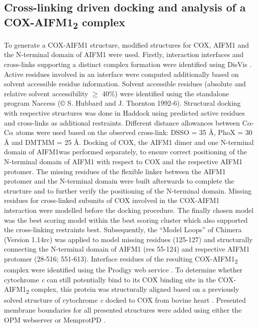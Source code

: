 \subsection*{Cross-linking driven docking and analysis of a COX-AIFM1\textsubscript{2} complex}
To generate a COX-AIFM1 structure, modified structures for COX, AIFM1 and the N-terminal domain of AIFM1 were used. Firstly, interaction interfaces and cross-links supporting a distinct complex formation were identified using DisVis \cite{RN44}. Active residues involved in an interface were computed additionally based on solvent accessible residue information. Solvent accessible residues (absolute and relative solvent accessibility $\geq$ 40\%) were identified using the standalone program Naccess (© S. Hubbard and J. Thornton 1992-6). Structural docking with respective structures was done in Haddock \cite{RN68, RN45} using predicted active residues and cross-links as additional restraints. Different distance allowances between C$\alpha$-C$\alpha$ atoms were used based on the observed cross-link: DSSO = 35 Å, PhoX = 30 Å and DMTMM = 25 Å. Docking of COX, the AIFM1 dimer and one N-terminal domain of AIFM1was performed separately, to ensure correct positioning of the N-terminal domain of AIFM1 with respect to COX and the respective AIFM1 protomer. The missing residues of the flexible linker between the AIFM1 protomer and the N-terminal domain were built afterwards to complete the structure and to further verify the positioning of the N-terminal domain. Missing residues for cross-linked subunits of COX involved in the COX-AIFM1 interaction were modelled before the docking procedure. The finally chosen model was the best scoring model within the best scoring cluster which also supported the cross-linking restraints best. Subsequently, the “Model Loops” of Chimera (Version 1.14rc) \cite{RN47, RN46} was applied to model missing residues (125-127) and structurally connecting the N-terminal domain of AIFM1 (res 55-124) and respective AIFM1 protomer (28-516; 551-613). Interface residues of the resulting COX-AIFM1\textsubscript{2}  complex were identified using the Prodigy web service \cite{RN69}. To determine whether cytochrome \emph{c} can still potentially bind to its COX binding site in the COX-AIFM1\textsubscript{2}  complex, this protein was structurally aligned based on a previously solved structure of cytochrome \emph{c} docked to COX from bovine heart \cite{RN54}. Presented membrane boundaries for all presented structures were added using either the OPM \cite{RN70} webserver or MemprotPD \cite{RN71}.
%
